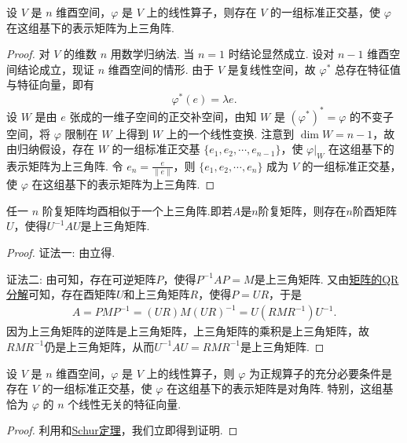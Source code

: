 \documentclass[../../main.tex]{subfiles}
\begin{document}
\begin{theorem}[Schur(舒尔)定理]\label{theorem:Schur(舒尔)定理}
设 $V$ 是 $n$ 维酉空间，$\varphi$ 是 $V$ 上的线性算子，则存在 $V$ 的一组标准正交基，使 $\varphi$ 在这组基下的表示矩阵为上三角阵.
\end{theorem}
\begin{proof}
对 $V$ 的维数 $n$ 用数学归纳法. 当 $n = 1$ 时结论显然成立. 设对 $n - 1$ 维酉空间结论成立，现证 $n$ 维酉空间的情形. 由于 $V$ 是复线性空间，故 $\varphi^*$ 总存在特征值与特征向量，即有
\[
\varphi^*(e) = \lambda e.
\]
设 $W$ 是由 $e$ 张成的一维子空间的正交补空间，由知 $W$ 是 $(\varphi^*)^* = \varphi$ 的不变子空间，将 $\varphi$ 限制在 $W$ 上得到 $W$ 上的一个线性变换. 注意到 $\dim W = n - 1$，故由归纳假设，存在 $W$ 的一组标准正交基 $\{e_1,e_2,\cdots,e_{n - 1}\}$，使 $\varphi|_W$ 在这组基下的表示矩阵为上三角阵. 令 $e_n = \frac{e}{\|e\|}$，则 $\{e_1,e_2,\cdots,e_n\}$ 成为 $V$ 的一组标准正交基，使 $\varphi$ 在这组基下的表示矩阵为上三角阵.
\end{proof}

\begin{corollary}[Schur定理]\label{corollary:Schur(舒尔)定理}
任一 $n$ 阶复矩阵均酉相似于一个上三角阵.即若\(A\)是\(n\)阶复矩阵，则存在\(n\)阶酉矩阵\(U\)，使得\(U^{-1}AU\)是上三角矩阵.
\end{corollary}
\begin{proof}
{\color{blue}证法一:}
由立得.

{\color{blue}证法二:}
由可知，存在可逆矩阵\(P\)，使得\(P^{-1}AP = M\)是上三角矩阵. 又由\hyperref[theorem:矩阵的QR分解]{矩阵的QR分解}可知，存在酉矩阵\(U\)和上三角矩阵\(R\)，使得\(P = UR\)，于是
\begin{align*}
A = PMP^{-1}=(UR)M(UR)^{-1}=U(RMR^{-1})U^{-1}.
\end{align*}
因为上三角矩阵的逆阵是上三角矩阵，上三角矩阵的乘积是上三角矩阵，故\(RMR^{-1}\)仍是上三角矩阵，从而\(U^{-1}AU = RMR^{-1}\)是上三角矩阵. 
\end{proof}

\begin{theorem}
设 $V$ 是 $n$ 维酉空间，$\varphi$ 是 $V$ 上的线性算子，则 $\varphi$ 为正规算子的充分必要条件是存在 $V$ 的一组标准正交基，使 $\varphi$ 在这组基下的表示矩阵是对角阵. 特别，这组基恰为 $\varphi$ 的 $n$ 个线性无关的特征向量.
\end{theorem}
\begin{proof}
利用和\hyperref[corollary:Schur(舒尔)定理]{Schur定理}，我们立即得到证明.
\end{proof}
\end{document}
